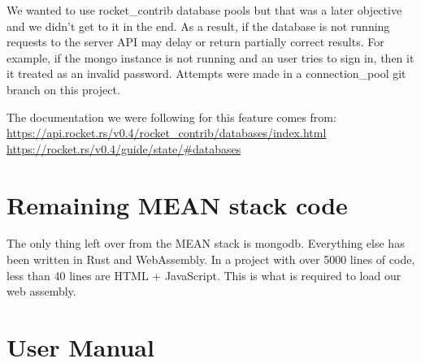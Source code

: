 \documentclass[letterpaper]{article}
\begin{document}
We wanted to use rocket\_contrib database pools but that was a later objective and we didn't get to it in the end. As a result, if the database is not running requests to the server API may delay or return partially correct results. For example, if the mongo instance is not running and an user tries to sign in, then it it treated as an invalid password. Attempts were made in a connection\_pool git branch on this project.

The documentation we were following for this feature comes from:
\url{https://api.rocket.rs/v0.4/rocket\_contrib/databases/index.html}
\url{https://rocket.rs/v0.4/guide/state/#databases}

\section{Remaining MEAN stack code}
The only thing left over from the MEAN stack is mongodb. Everything
else has been written in Rust and WebAssembly. In a project with over
5000 lines of code, less than 40 lines are HTML + JavaScript. This is
what is required to load our web assembly.


\section{User Manual}
\end{document}
